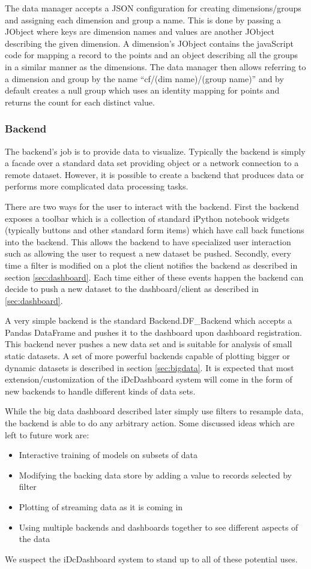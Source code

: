 \documentclass[letter,twocolumn]{article}
\begin{document}
The data manager accepts a JSON configuration for creating dimensions/groups and assigning each dimension and group a name.  
This is done by passing a JObject where keys are dimension names and values are another JObject describing the given dimension.
A dimension's JObject contains the javaScript code for mapping a record to the points and an object describing all the groups in a similar manner as the dimensions.
The data manager then allows referring to a dimension and group by the name ``cf/(dim name)/(group name)'' and by default creates a null group which uses an identity mapping for points and returns the count for each distinct value.

\subsubsection{Backend}\label{sec:backend}

The backend's job is to provide data to visualize.
Typically the backend is simply a facade over a standard data set providing object or a network connection to a remote dataset.  
However, it is possible to create a backend that produces data or performs more complicated data processing tasks.

There are two ways for the user to interact with the backend.
First the backend exposes a toolbar which is a collection of standard iPython notebook widgets (typically buttons and other standard form items) which have call back functions into the backend.
This allows the backend to have specialized user interaction such as allowing the user to request a new dataset be pushed.
Secondly, every time a filter is modified on a plot the client notifies the backend as described in section \ref{sec:dashboard}.
Each time either of these events happen the backend can decide to push a new dataset to the dashboard/client as described in \ref{sec:dashboard}.

A very simple backend is the standard Backend.DF\_Backend which accepts a Pandas DataFrame and pushes it to the dashboard upon dashboard registration.
This backend never pushes a new data set and is suitable for analysis of small static datasets.
A set of more powerful backends capable of plotting bigger or dynamic datasets is described in section \ref{sec:bigdata}.
It is expected that most extension/customization of the iDcDashboard system will come in the form of new backends to handle different kinds of data sets.

While the big data dashboard described later simply use filters to resample data, the backend is able to do any arbitrary action.  Some discussed ideas which are left to future work are:
\begin{itemize}
	\item Interactive training of models on subsets of data
	\item Modifying the backing data store by adding a value to records selected by filter
	\item Plotting of streaming data as it is coming in
	\item Using multiple backends and dashboards together to see different aspects of the data
\end{itemize}
We suspect the iDcDashboard system to stand up to all of these potential uses.
\end{document}
